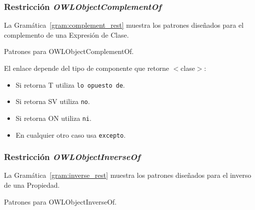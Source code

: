 \subsubsection{Restricción \emph{OWLObjectComplementOf}}
La Gramática~\ref{gram:complement_rest} muestra los patrones diseñados para el complemento de una Expresión de Clase.

\begin{GrammarEnv}
\begin{grammar}
\end{grammar}
\caption{Patrones para OWLObjectComplementOf.}\label{gram:complement_rest}
\end{GrammarEnv}

El enlace depende del tipo de componente que retorne $<$clase$>$:
\begin{itemize}
    \item Si retorna T utiliza \texttt{lo opuesto de}.
    \item Si retorna SV utiliza \texttt{no}.
    \item Si retorna ON utiliza \texttt{ni}.
    \item En cualquier otro caso usa \texttt{excepto}.
\end{itemize}

\subsubsection{Restricción \emph{OWLObjectInverseOf}}
La Gramática~\ref{gram:inverse_rest} muestra los patrones diseñados para el inverso de una Propiedad.

\begin{GrammarEnv}
\begin{grammar}
\end{grammar}
\caption{Patrones para OWLObjectInverseOf.}\label{gram:inverse_rest}
\end{GrammarEnv}

